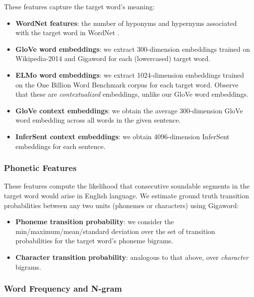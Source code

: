 \documentclass{dcthesis}
\theoremstyle{definition}
\theoremstyle{remark}
\begin{document}
\label{paper:semantic_features} These features capture the target word's meaning:

\begin{itemize}
  \item \textbf{WordNet features}: the number of hyponyms and hypernyms associated with the target word in WordNet \citep{Fellbaum:2005}.
  \item \textbf{GloVe word embeddings}: we extract 300-dimension embeddings trained on Wikipedia-2014 and Gigaword \citep{pennington2014glove} for each (lowercased) target word. 
  \item \textbf{ELMo word embeddings}: we extract 1024-dimension embeddings trained on the One Billion Word Benchmark corpus \citep{Peters:2018} for each target word. Observe that these are \textit{contextualized} embeddings, unlike our GloVe word embeddings. 
  \item \textbf{GloVe context embeddings}: we obtain the average 300-dimension GloVe word embedding across all words in the given sentence.
  \item \textbf{InferSent context embeddings}: we obtain 4096-dimension InferSent embeddings \citep{conneau-EtAl:2017:EMNLP2017} for each sentence.
\end{itemize}

\subsubsection{Phonetic Features}

These features compute the likelihood that consecutive soundable segments in the target word would arise in English language. We estimate ground truth transition probabilities between any two units (phonemes or characters) using Gigaword:

\begin{itemize}
  \item \textbf{Phoneme transition probability}: we consider the min/maximum/mean/standard deviation over the set of transition probabilities for the target word's phoneme bigrams. 
  \item \textbf{Character transition probability}: analogous to that above, over \textit{character} bigrams.
\end{itemize}

\subsubsection{Word Frequency and N-gram}
\end{document}
